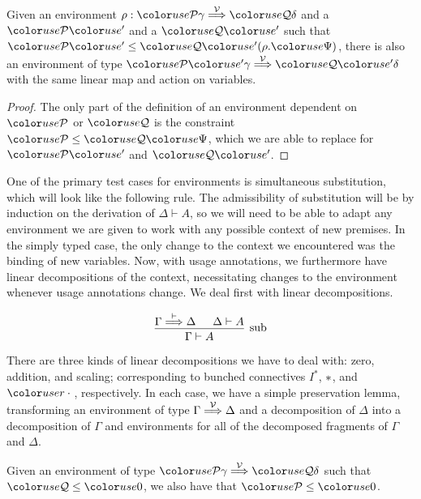 \begin{lemma}\label{thm:env-resize}
  Given an environment $\rho : \grP\gamma \env\V \grQ\delta$ and a $\grPprime$
  and a $\grQprime$ such that $\grPprime \leq \grQprime\plr{\rho.\gr\Psi}$,
  there is also an environment of type $\grPprime\gamma \env\V \grQprime\delta$
  with the same linear map and action on variables.
\end{lemma}
\begin{proof}
  The only part of the definition of an environment dependent on $\grP$ or
  $\grQ$ is the constraint $\grP \leq \grQ\gr\Psi$, which we are able to
  replace for $\grPprime$ and $\grQprime$.
\end{proof}

One of the primary test cases for environments is simultaneous substitution,
which will look like the following rule.
The admissibility of substitution will be by induction on the derivation of
$\Delta \vdash A$, so we will need to be able to adapt any environment we are
given to work with any possible context of new premises.
In the simply typed case, the only change to the context we encountered was the
binding of new variables.
Now, with usage annotations, we furthermore have linear decompositions of the
context, necessitating changes to the environment whenever usage annotations
change.
We deal first with linear decompositions.

\begin{displaymath}
  \begin{prooftree}
    \hypo{\Gamma \env{\vdash} \Delta}
    \hypo{\Delta \vdash A}
    \infer2[sub]{\Gamma \vdash A}
  \end{prooftree}
\end{displaymath}

There are three kinds of linear decompositions we have to deal with: zero,
addition, and scaling; corresponding to bunched connectives $I^*$, $\mathbin{*}$, and
$\gr r \cdot {}$, respectively.
In each case, we have a simple preservation lemma, transforming an environment
of type $\Gamma \stackrel{\mathcal V}\Longrightarrow \Delta$ and a decomposition of $\Delta$ into a
decomposition of $\Gamma$ and environments for all of the decomposed fragments
of $\Gamma$ and $\Delta$.

\begin{lemma}\label{thm:lr-env-zero}
  Given an environment of type $\grP\gamma \env\V \grQ\delta$ such that
  $\grQ \leq \gr 0$, we also have that $\grP \leq \gr 0$.
\end{lemma}


